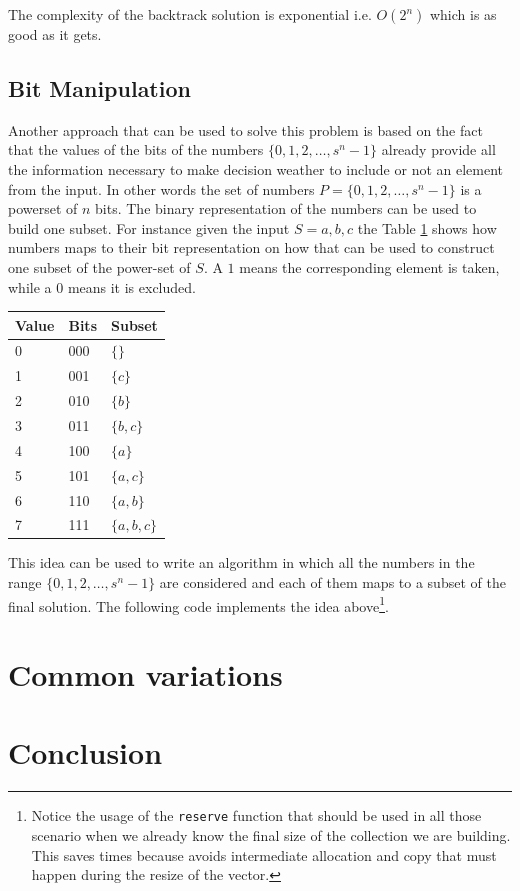 The complexity of the backtrack solution is exponential i.e. $O(2^n)$ which is as good as it gets.

\subsection{Bit Manipulation}
Another approach that can be used to solve this problem is based on the fact that the values of the bits of the numbers $\{0,1,2,\ldots, s^n-1\}$  already provide all the information necessary to make decision weather to include or not an element from the input. In other words the set of numbers $P=\{0,1,2,\ldots, s^n-1\}$ is a powerset of $n$ bits. The binary representation of the numbers can be used to build one subset. For instance
given the input $S={a,b,c}$ the Table \ref{tab:mapping_value_bits} shows how numbers maps to their bit representation on how that can be used to construct one subset of the power-set of $S$. A $1$ means the corresponding element is taken, while a $0$ means it is excluded.

\begin{table}
	\centering
	\begin{tabular}{|l|l|l|}
		\hline
		Value & Bits & Subset\\ \hline
		0     & 000  & $\{\}$\\ \hline
		1     & 001  & $\{c\}$\\ \hline
		2     & 010  & $\{b\}$\\ \hline
		3     & 011  & $\{b,c\}$\\ \hline
		4     & 100  & $\{a\}$\\ \hline
		5     & 101  & $\{a,c\}$\\ \hline
		6     & 110  & $\{a,b\}$\\ \hline
		7     & 111  & $\{a,b,c\}$\\ \hline
	\end{tabular}
	\label{tab:mapping_value_bits}
\end{table}

This idea can be used to write an algorithm in which all the numbers in the range $\{0,1,2,\ldots, s^n-1\}$ are considered and each of them maps to a subset of the final solution. 
The following code implements the idea above\footnote{Notice the usage of the \texttt{reserve} function that should be used in all those scenario when we already know the final size of the collection we are building. This saves times because avoids intermediate allocation and copy that must happen during the resize of the vector.}.

\begin{minipage}{\linewidth}
	
\end{minipage}

\section{Common variations}

\section{Conclusion}
